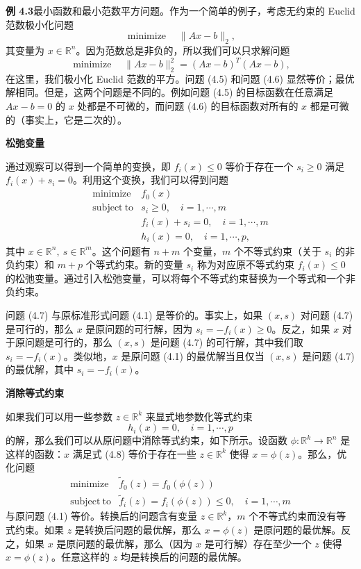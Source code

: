 \documentclass[UTF8,12pt,a4paper,fontset=fandol]{ctexart}
\begin{document}
\noindent\textbf{例 4.3}\quad 最小函数和最小范数平方问题。作为一个简单的例子，考虑无约束的 Euclid 范数极小化问题
\begin{equation}
\mathop{\mathrm{minimize}}\quad \|Ax-b\|_2,
\tag{4.5}
\end{equation}
其变量为 $x\in\mathbb{R}^n$。因为范数总是非负的，所以我们可以只求解问题
\begin{equation}
\mathop{\mathrm{minimize}}\quad \|Ax-b\|_2^2=(Ax-b)^T(Ax-b),
\tag{4.6}
\end{equation}
在这里，我们极小化 Euclid 范数的平方。问题 (4.5) 和问题 (4.6) 显然等价；最优解相同。但是，这两个问题是不同的。例如问题 (4.5) 的目标函数在任意满足 $Ax-b=0$ 的 $x$ 处都是不可微的，而问题 (4.6) 的目标函数对所有的 $x$ 都是可微的（事实上，它是二次的）。

\noindent\textbf{松弛变量}

通过观察可以得到一个简单的变换，即 $f_i(x)\leq 0$ 等价于存在一个 $s_i\geq 0$ 满足 $f_i(x)+s_i=0$。利用这个变换，我们可以得到问题
\begin{equation}
\begin{array}{ll}
\mathop{\mathrm{minimize}} & f_0(x)\\
\mathrm{subject\ to} & s_i\geq 0,\quad i=1,\cdots,m\\
& f_i(x)+s_i=0,\quad i=1,\cdots,m\\
& h_i(x)=0,\quad i=1,\cdots,p,
\end{array}
\tag{4.7}
\end{equation}
其中 $x\in\mathbb{R}^n,\ s\in\mathbb{R}^m$。这个问题有 $n+m$ 个变量，$m$ 个不等式约束（关于 $s_i$ 的非负约束）和 $m+p$ 个等式约束。新的变量 $s_i$ 称为对应原不等式约束 $f_i(x)\leq 0$ 的松弛变量。通过引入松弛变量，可以将每个不等式约束替换为一个等式和一个非负约束。

问题 (4.7) 与原标准形式问题 (4.1) 是等价的。事实上，如果 $(x,s)$ 对问题 (4.7) 是可行的，那么 $x$ 是原问题的可行解，因为 $s_i=-f_i(x)\geq 0$。反之，如果 $x$ 对于原问题是可行的，那么 $(x,s)$ 是问题 (4.7) 的可行解，其中我们取 $s_i=-f_i(x)$。类似地，$x$ 是原问题 (4.1) 的最优解当且仅当 $(x,s)$ 是问题 (4.7) 的最优解，其中 $s_i=-f_i(x)$。

\noindent\textbf{消除等式约束}

如果我们可以用一些参数 $z\in\mathbb{R}^k$ 来显式地参数化等式约束
\begin{equation}
h_i(x)=0,\quad i=1,\cdots,p
\tag{4.8}
\end{equation}
的解，那么我们可以从原问题中消除等式约束，如下所示。设函数 $\phi:\mathbb{R}^k\to\mathbb{R}^n$ 是这样的函数：$x$ 满足式 (4.8) 等价于存在一些 $z\in\mathbb{R}^k$ 使得 $x=\phi(z)$。那么，优化问题
\[
\begin{array}{ll}
\mathop{\mathrm{minimize}} & \tilde{f}_0(z)=f_0(\phi(z))\\
\mathrm{subject\ to} & \tilde{f}_i(z)=f_i(\phi(z))\leq 0,\quad i=1,\cdots,m
\end{array}
\]
与原问题 (4.1) 等价。转换后的问题含有变量 $z\in\mathbb{R}^k$，$m$ 个不等式约束而没有等式约束。如果 $z$ 是转换后问题的最优解，那么 $x=\phi(z)$ 是原问题的最优解。反之，如果 $x$ 是原问题的最优解，那么（因为 $x$ 是可行解）存在至少一个 $z$ 使得 $x=\phi(z)$。任意这样的 $z$ 均是转换后的问题的最优解。
\end{document}
